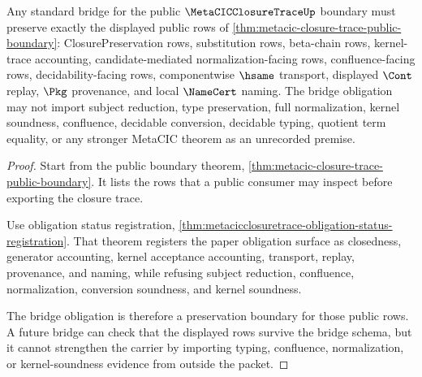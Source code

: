 \begin{theorem}
\label{thm:metacicclosuretrace-public-bridge-obligation}
Any standard bridge for the public $\MetaCICClosureTraceUp$ boundary must preserve exactly the displayed public rows of \autoref{thm:metacic-closure-trace-public-boundary}: ClosurePreservation rows, substitution rows, beta-chain rows, kernel-trace accounting, candidate-mediated normalization-facing rows, confluence-facing rows, decidability-facing rows, componentwise $\hsame$ transport, displayed $\Cont$ replay, $\Pkg$ provenance, and local $\NameCert$ naming. The bridge obligation may not import subject reduction, type preservation, full normalization, kernel soundness, confluence, decidable conversion, decidable typing, quotient term equality, or any stronger MetaCIC theorem as an unrecorded premise.
\end{theorem}
\begin{proof}
Start from the public boundary theorem, \autoref{thm:metacic-closure-trace-public-boundary}. It lists the rows that a public consumer may inspect before exporting the closure trace.

Use obligation status registration, \autoref{thm:metacicclosuretrace-obligation-status-registration}. That theorem registers the paper obligation surface as closedness, generator accounting, kernel acceptance accounting, transport, replay, provenance, and naming, while refusing subject reduction, confluence, normalization, conversion soundness, and kernel soundness.

The bridge obligation is therefore a preservation boundary for those public rows. A future bridge can check that the displayed rows survive the bridge schema, but it cannot strengthen the carrier by importing typing, confluence, normalization, or kernel-soundness evidence from outside the packet.
\end{proof}


